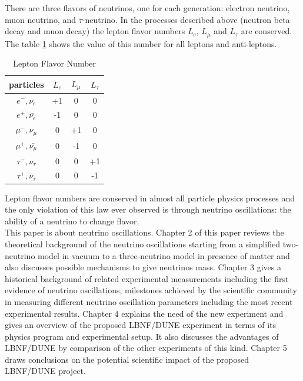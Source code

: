 There are three flavors of neutrinos, one for each generation: electron neutrino, muon neutrino, and $\tau$-neutrino. In the processes described above (neutron beta decay and muon decay) the lepton flavor numbers $L_e$, $L_{\mu}$ and $L_{\tau}$ are conserved. The table \ref{tab:LeptonFlavorNumber} shows the value of this number for all leptons and anti-leptons. \\

\begin{table}[h]
  \begin{center}
  \caption{ Lepton Flavor Number}
  \begin{tabular}{|c|c|c|c|}
     particles & $L_e$ & $L_{\mu}$ & $L_{\tau}$ \\ \hline
     $e^-,\nu_e$ &  +1  &  0  &  0  \\ \hline 
     $e^+, \bar{\nu_e}$ &  -1  &  0  &  0  \\ \hline 
     $\mu^-,\nu_{\mu}$ &  0  &  +1  &  0  \\ \hline 
     $\mu^+, \bar{\nu_{\mu}}$ &  0  &  -1  &  0  \\ \hline 
     $\tau^-,\nu_{\tau}$ &  0  &  0  &  +1  \\ \hline 
     $\tau^+, \bar{\nu_{\tau}}$ &  0  &  0  &  -1  \\ \hline 
  \end{tabular}
  \label{tab:LeptonFlavorNumber}
  \end{center}
\end{table}

Lepton flavor numbers are conserved in almost all particle physics processes and the only violation of this law ever observed is through neutrino oscillations: the ability of a neutrino to change flavor.\\

This paper is about neutrino oscillations. Chapter 2 of this paper reviews the theoretical background of the neutrino oscillations starting from a simplified two-neutrino model in vacuum to a three-neutrino model in presence of matter and also discusses possible mechanisms to give neutrinos mass. Chapter 3 gives a historical background of related experimental measurements including the first evidence of neutrino oscillations, milestones achieved by the scientific community in measuring different neutrino oscillation parameters including the most recent experimental results. Chapter 4 explains the need of the new experiment and gives an overview of the proposed LBNF/DUNE experiment in terms of its physics program and experimental setup. It also discusses the advantages of LBNF/DUNE by comparison of the other experiments of this kind. Chapter 5 draws conclusions on the potential scientific impact of the proposed LBNF/DUNE project.  


